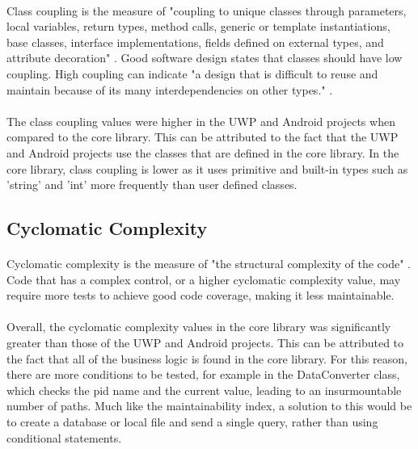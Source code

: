 {		\paragraph{}{
		Class coupling is the measure of "coupling to unique classes through parameters, local variables, return types, method calls, generic or template instantiations, base classes, interface implementations, fields defined on external types, and attribute decoration" \cite{CodeMetrics}. Good software design states that classes should have low coupling. High coupling can indicate "a design that is difficult to reuse and maintain because of its many interdependencies on other types." \cite{CodeMetrics}.
		}
		\paragraph{}{
		The class coupling values were higher in the UWP and Android projects when compared to the core library. This can be attributed to the fact that the UWP and Android projects use the classes that are defined in the core library. In the core library, class coupling is lower as it uses primitive and built-in types such as 'string' and 'int' more frequently than user defined classes.
		}
	
	\subsection*{Cyclomatic Complexity}
		\paragraph{}{
		Cyclomatic complexity is the measure of "the structural complexity of the code" \cite{CodeMetrics}. Code that has a complex control, or a higher cyclomatic complexity value, may require more tests to achieve good code coverage, making it less maintainable.
		}
		\paragraph{}{
		Overall, the cyclomatic complexity values in the core library was significantly greater than those of the UWP and Android projects. This can be attributed to the fact that all of the business logic is found in the core library. For this reason, there are more conditions to be tested, for example in the DataConverter class, which checks the pid name and the current value, leading to an insurmountable number of paths. Much like the maintainability index, a solution to this would be to create a database or local file and send a single query, rather than using conditional statements.
		}
	
}
